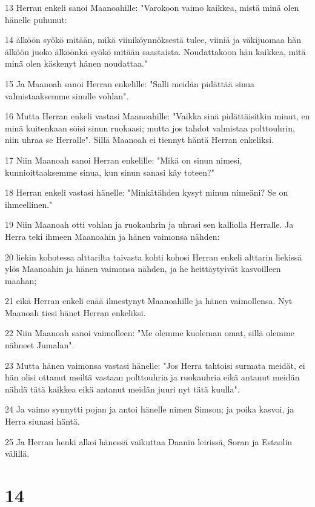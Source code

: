 \par 13 Herran enkeli sanoi Maanoahille: "Varokoon vaimo kaikkea, mistä minä olen hänelle puhunut:
\par 14 älköön syökö mitään, mikä viiniköynnöksestä tulee, viiniä ja väkijuomaa hän älköön juoko älköönkä syökö mitään saastaista. Noudattakoon hän kaikkea, mitä minä olen käskenyt hänen noudattaa."
\par 15 Ja Maanoah sanoi Herran enkelille: "Salli meidän pidättää sinua valmistaaksemme sinulle vohlan".
\par 16 Mutta Herran enkeli vastasi Maanoahille: "Vaikka sinä pidättäisitkin minut, en minä kuitenkaan söisi sinun ruokaasi; mutta jos tahdot valmistaa polttouhrin, niin uhraa se Herralle". Sillä Maanoah ei tiennyt häntä Herran enkeliksi.
\par 17 Niin Maanoah sanoi Herran enkelille: "Mikä on sinun nimesi, kunnioittaaksemme sinua, kun sinun sanasi käy toteen?"
\par 18 Herran enkeli vastasi hänelle: "Minkätähden kysyt minun nimeäni? Se on ihmeellinen."
\par 19 Niin Maanoah otti vohlan ja ruokauhrin ja uhrasi sen kalliolla Herralle. Ja Herra teki ihmeen Maanoahin ja hänen vaimonsa nähden:
\par 20 liekin kohotessa alttarilta taivasta kohti kohosi Herran enkeli alttarin liekissä ylös Maanoahin ja hänen vaimonsa nähden, ja he heittäytyivät kasvoilleen maahan;
\par 21 eikä Herran enkeli enää ilmestynyt Maanoahille ja hänen vaimollensa. Nyt Maanoah tiesi hänet Herran enkeliksi.
\par 22 Niin Maanoah sanoi vaimolleen: "Me olemme kuoleman omat, sillä olemme nähneet Jumalan".
\par 23 Mutta hänen vaimonsa vastasi hänelle: "Jos Herra tahtoisi surmata meidät, ei hän olisi ottanut meiltä vastaan polttouhria ja ruokauhria eikä antanut meidän nähdä tätä kaikkea eikä antanut meidän juuri nyt tätä kuulla".
\par 24 Ja vaimo synnytti pojan ja antoi hänelle nimen Simson; ja poika kasvoi, ja Herra siunasi häntä.
\par 25 Ja Herran henki alkoi hänessä vaikuttaa Daanin leirissä, Soran ja Estaolin välillä.

\chapter{14}

